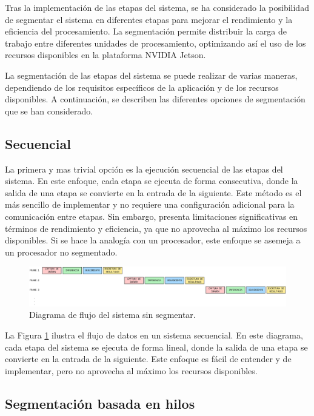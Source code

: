 \documentclass[11pt,spanish,listoffigures,listoftables]{tfgetsinf}
\begin{document}
Tras la implementación de las etapas del sistema, se ha considerado la posibilidad de segmentar el sistema en diferentes etapas para mejorar el rendimiento y la eficiencia del procesamiento. La segmentación permite distribuir la carga de trabajo entre diferentes unidades de procesamiento, optimizando así el uso de los recursos disponibles en la plataforma NVIDIA Jetson.

La segmentación de las etapas del sistema se puede realizar de varias maneras, dependiendo de los requisitos específicos de la aplicación y de los recursos disponibles. A continuación, se describen las diferentes opciones de segmentación que se han considerado.
    
\subsection{Secuencial}

La primera y mas trivial opción es la ejecución secuencial de las etapas del sistema. En este enfoque, cada etapa se ejecuta de forma consecutiva, donde la salida de una etapa se convierte en la entrada de la siguiente. Este método es el más sencillo de implementar y no requiere una configuración adicional para la comunicación entre etapas. Sin embargo, presenta limitaciones significativas en términos de rendimiento y eficiencia, ya que no aprovecha al máximo los recursos disponibles. Si se hace la analogía con un procesador, este enfoque se asemeja a un procesador no segmentado.

\begin{figure}[H]
   \centering
   \includegraphics[width=1\textwidth]{images/diseno_e_implementacion/secuencial.png}
   \caption{Diagrama de flujo del sistema sin segmentar.}
   \label{fig:secuencial}
\end{figure}

La Figura \ref{fig:secuencial} ilustra el flujo de datos en un sistema secuencial. En este diagrama, cada etapa del sistema se ejecuta de forma lineal, donde la salida de una etapa se convierte en la entrada de la siguiente. Este enfoque es fácil de entender y de implementar, pero no aprovecha al máximo los recursos disponibles.

\subsection{Segmentación basada en hilos}
\end{document}
